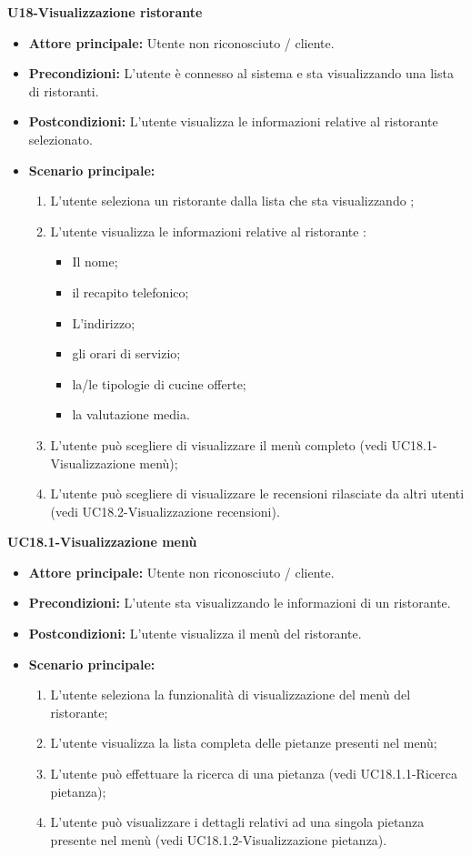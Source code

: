 \textbf{U18-Visualizzazione ristorante}
\begin{itemize}
\item \textbf{Attore principale:} Utente non riconosciuto / cliente.
\item \textbf{Precondizioni:} L'utente è connesso al sistema e sta visualizzando una lista di ristoranti.
\item \textbf{Postcondizioni:} L'utente visualizza le informazioni relative al ristorante selezionato.
\item \textbf{Scenario principale:}
\begin{enumerate}
    \item L'utente seleziona un ristorante dalla lista che sta visualizzando ;
    \item L'utente visualizza le informazioni relative al ristorante :
    \begin{itemize}
        \item Il nome;
        \item il recapito telefonico;
        \item L'indirizzo;
        \item gli orari di servizio;
        \item la/le tipologie di cucine offerte;
        \item la valutazione media.
    \end{itemize}
    \item L'utente può scegliere di visualizzare il menù completo (vedi UC18.1-Visualizzazione menù);
    \item L'utente può scegliere di visualizzare le recensioni rilasciate da altri utenti (vedi UC18.2-Visualizzazione recensioni).
\end{enumerate}
\end{itemize}

\textbf{UC18.1-Visualizzazione menù}
\begin{itemize}
\item \textbf{Attore principale:} Utente non riconosciuto / cliente.
\item \textbf{Precondizioni:} L'utente sta visualizzando le informazioni di un ristorante.
\item \textbf{Postcondizioni:} L'utente visualizza il menù del ristorante.
\item \textbf{Scenario principale:}
\begin{enumerate}
    \item L'utente seleziona la funzionalità di visualizzazione del menù del ristorante;
    \item L'utente visualizza la lista completa delle pietanze presenti nel menù;
    \item L'utente può effettuare la ricerca di una pietanza (vedi UC18.1.1-Ricerca pietanza);
    \item L'utente può visualizzare i dettagli relativi ad una singola pietanza presente
     nel menù (vedi UC18.1.2-Visualizzazione pietanza).
\end{enumerate}
\end{itemize}

